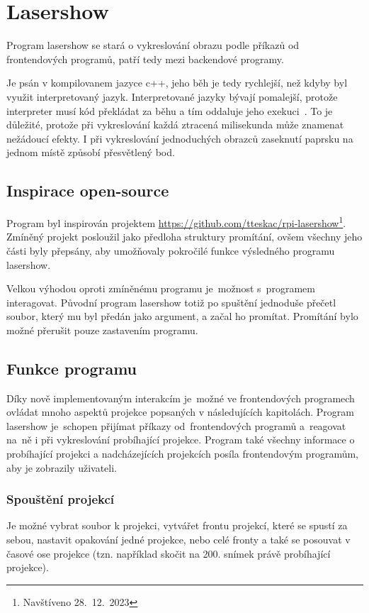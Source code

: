 \section{Lasershow}
Program lasershow se stará o vykreslování obrazu podle příkazů od frontendových programů, patří tedy mezi backendové programy.

Je psán v kompilovanem jazyce c++, jeho běh je tedy rychlejší, než kdyby byl využit interpretovaný jazyk.
Interpretované jazyky bývají pomalejší, protože interpreter musí kód překládat za běhu a tím oddaluje jeho exekuci~\cite{interpret}.
To je důležité, protože při vykreslování každá ztracená milisekunda může znamenat nežádoucí efekty. I při vykreslování jednoduchých obrazců zaseknutí paprsku na jednom místě způsobí přesvětlený bod.

\subsection{Inspirace open-source}
Program byl inspirován projektem \url{https://github.com/tteskac/rpi-lasershow}\footnote{Navštíveno 28.~12.~2023}. Zmíněný projekt posloužil jako předloha struktury promítání, ovšem všechny jeho části byly přepsány, aby umožňovaly pokročilé funkce výsledného programu lasershow.

Velkou výhodou oproti zmíněnému programu je~možnost s~programem interagovat.
Původní program lasershow totiž po spuštění jednoduše přečetl soubor, který mu byl předán jako argument, a začal ho promítat. Promítání bylo možné přerušit pouze zastavením programu.

\subsection{Funkce programu}
Díky nově implementovaným interakcím je~možné ve frontendových programech ovládat mnoho aspektů projekce popsaných v následujících kapitolách. Program lasershow je~schopen přijímat příkazy od~frontendových programů a~reagovat na~ně i při vykreslování probíhající projekce. Program také všechny informace o probíhající projekci a nadcházejících projekcích posíla frontendovým programům, aby je zobrazily uživateli.

\subsubsection{Spouštění projekcí}
Je možné vybrat soubor k projekci, vytvářet frontu projekcí, které se spustí za sebou, nastavit opakování jedné projekce, nebo celé fronty a také se posouvat v časové ose projekce (tzn. například skočit na 200. snímek právě probíhající projekce).

